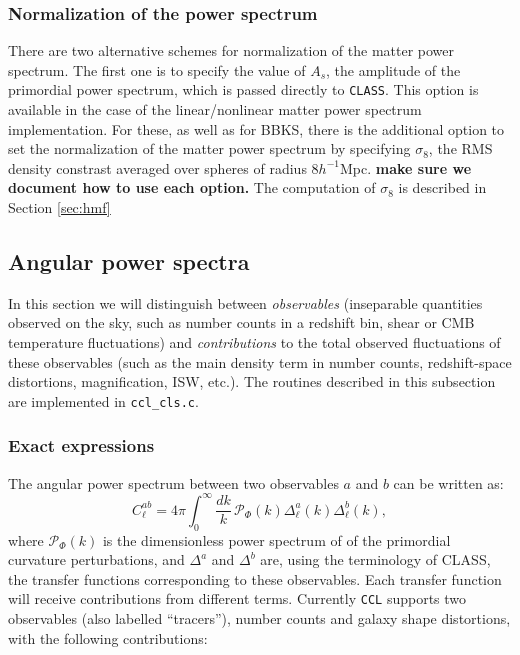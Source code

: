 \documentclass[\docopts]{\docclass}
\begin{document}
\subsubsection{Normalization of the power spectrum}
\label{sec:PSnorm}

There are two alternative schemes for normalization of the matter power spectrum. The first one is to specify the value of $A_s$, the amplitude of the primordial power spectrum, which is passed directly to {\tt CLASS}. This option is available in the case of the linear/nonlinear matter power spectrum implementation. For these, as well as for BBKS, there is the additional option to set the normalization of the matter power spectrum by specifying $\sigma_8$, the RMS density constrast averaged over spheres of radius $8h^{-1}$Mpc. {\bf make sure we document how to use each option.} The computation of $\sigma_8$ is described in Section \ref{sec:hmf}

\subsection{Angular power spectra}
\label{sec:cl}

In this section we will distinguish between {\sl observables} (inseparable quantities observed on the sky, such as number counts in a redshift bin, shear or CMB temperature fluctuations) and {\sl contributions} to the total observed fluctuations of these observables (such as the main density term in number counts, redshift-space distortions, magnification, ISW, etc.).
The routines described in this subsection are implemented in {\tt ccl\_cls.c}.

\subsubsection{Exact expressions}
The angular power spectrum between two observables $a$ and $b$ can be written as:
\begin{equation}
 C^{ab}_\ell=4\pi\int_0^\infty \frac{dk}{k}\,\mathcal{P}_\Phi(k)\Delta^a_\ell(k)\Delta^b_\ell(k),
\end{equation}
where $\mathcal{P}_\Phi(k)$ is the dimensionless power spectrum of of the primordial curvature perturbations, and $\Delta^a$ and $\Delta^b$ are, using the terminology of CLASS, the transfer functions corresponding to these observables. Each transfer function will receive contributions from different terms. Currently {\tt CCL} supports two observables (also labelled ``tracers''), number counts and galaxy shape distortions, with the following contributions:
\end{document}

